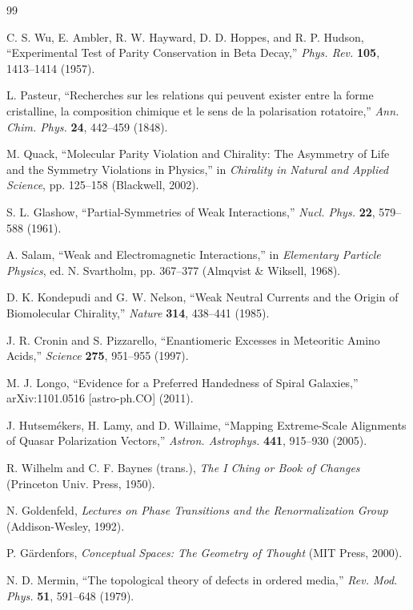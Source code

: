 \documentclass[11pt,a4paper]{article}
\begin{document}
\begin{thebibliography}{99}

C. S. Wu, E. Ambler, R. W. Hayward, D. D. Hoppes, and R. P. Hudson,
``Experimental Test of Parity Conservation in Beta Decay,''
\textit{Phys. Rev.} \textbf{105}, 1413--1414 (1957).

L. Pasteur,
``Recherches sur les relations qui peuvent exister entre la forme cristalline, la composition chimique et le sens de la polarisation rotatoire,''
\textit{Ann. Chim. Phys.} \textbf{24}, 442--459 (1848).

M. Quack,
``Molecular Parity Violation and Chirality: The Asymmetry of Life and the Symmetry Violations in Physics,''
in \textit{Chirality in Natural and Applied Science}, pp. 125--158 (Blackwell, 2002).

S. L. Glashow,
``Partial-Symmetries of Weak Interactions,''
\textit{Nucl. Phys.} \textbf{22}, 579--588 (1961).

A. Salam,
``Weak and Electromagnetic Interactions,''
in \textit{Elementary Particle Physics}, ed. N. Svartholm, pp. 367--377 (Almqvist \& Wiksell, 1968).

D. K. Kondepudi and G. W. Nelson,
``Weak Neutral Currents and the Origin of Biomolecular Chirality,''
\textit{Nature} \textbf{314}, 438--441 (1985).

J. R. Cronin and S. Pizzarello,
``Enantiomeric Excesses in Meteoritic Amino Acids,''
\textit{Science} \textbf{275}, 951--955 (1997).

M. J. Longo,
``Evidence for a Preferred Handedness of Spiral Galaxies,''
arXiv:1101.0516 [astro-ph.CO] (2011).

J. Hutsem\'ekers, H. Lamy, and D. Willaime,
``Mapping Extreme-Scale Alignments of Quasar Polarization Vectors,''
\textit{Astron. Astrophys.} \textbf{441}, 915--930 (2005).

R. Wilhelm and C. F. Baynes (trans.),
\textit{The I Ching or Book of Changes} (Princeton Univ. Press, 1950).

N. Goldenfeld,
\textit{Lectures on Phase Transitions and the Renormalization Group} (Addison-Wesley, 1992).

P. G\"ardenfors,
\textit{Conceptual Spaces: The Geometry of Thought} (MIT Press, 2000).

N. D. Mermin,
``The topological theory of defects in ordered media,''
\textit{Rev. Mod. Phys.} \textbf{51}, 591--648 (1979).


\end{thebibliography}
\end{document}

